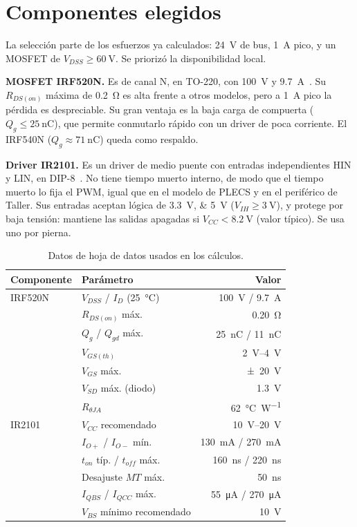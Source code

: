 \documentclass[10pt,twocolumn,letterpaper]{article}
\begin{document}
\section{Componentes elegidos}
La selección parte de los esfuerzos ya calculados: \SI{24}{\volt} de bus, \SI{1}{\ampere} pico, y un MOSFET de $V_{DSS}\ge\SI{60}{\volt}$. Se priorizó la disponibilidad local.

\textbf{MOSFET IRF520N.} Es de canal N, en TO-220, con \SI{100}{\volt} y \SI{9,7}{\ampere}~\cite{irf520n}. Su $R_{DS(on)}$ máxima de \SI{0,2}{\ohm} es alta frente a otros modelos, pero a \SI{1}{\ampere} pico la pérdida es despreciable. Su gran ventaja es la baja carga de compuerta ($Q_g\le\SI{25}{\nano\coulomb}$), que permite conmutarlo rápido con un driver de poca corriente. El IRF540N ($Q_g\approx\SI{71}{\nano\coulomb}$) queda como respaldo.

\textbf{Driver IR2101.} Es un driver de medio puente con entradas independientes HIN y LIN, en DIP-8~\cite{ir2101}. No tiene tiempo muerto interno, de modo que el tiempo muerto lo fija el PWM, igual que en el modelo de PLECS y en el periférico de Taller. Sus entradas aceptan lógica de \SIlist{3,3;5}{\volt} ($V_{IH}\ge\SI{3}{\volt}$), y protege por baja tensión: mantiene las salidas apagadas si $V_{CC}<\SI{8,2}{\volt}$ (valor típico). Se usa uno por pierna.

\begin{table}[!t]
\centering
\caption{Datos de hoja de datos usados en los cálculos.}
\label{tab:datos}
\footnotesize
\begin{tabular}{@{}llr@{}}
\toprule
Componente & Parámetro & Valor \\
\midrule
IRF520N & $V_{DSS}$ / $I_D$ (\SI{25}{\celsius}) & \SI{100}{\volt} / \SI{9,7}{\ampere} \\
 & $R_{DS(on)}$ máx. & \SI{0,20}{\ohm} \\
 & $Q_g$ / $Q_{gd}$ máx. & \SI{25}{\nano\coulomb} / \SI{11}{\nano\coulomb} \\
 & $V_{GS(th)}$ & \SIrange{2}{4}{\volt} \\
 & $V_{GS}$ máx. & \SI{\pm20}{\volt} \\
 & $V_{SD}$ máx. (diodo) & \SI{1,3}{\volt} \\
 & $R_{\theta JA}$ & \SI{62}{\celsius\per\watt} \\
\midrule
IR2101 & $V_{CC}$ recomendado & \SIrange{10}{20}{\volt} \\
 & $I_{O+}$ / $I_{O-}$ mín. & \SI{130}{\milli\ampere} / \SI{270}{\milli\ampere} \\
 & $t_{on}$ típ. / $t_{off}$ máx. & \SI{160}{\nano\second} / \SI{220}{\nano\second} \\
 & Desajuste $MT$ máx. & \SI{50}{\nano\second} \\
 & $I_{QBS}$ / $I_{QCC}$ máx. & \SI{55}{\micro\ampere} / \SI{270}{\micro\ampere} \\
 & $V_{BS}$ mínimo recomendado & \SI{10}{\volt} \\
\bottomrule
\end{tabular}
\end{table}
\end{document}
